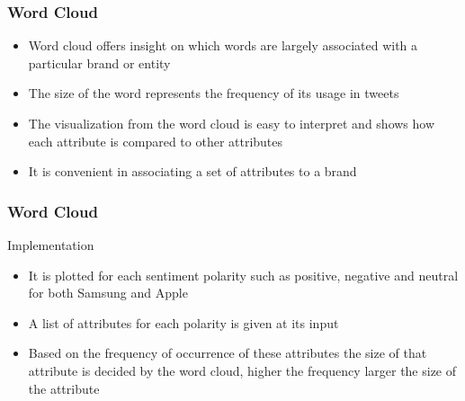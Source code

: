 \documentclass{beamer}
\begin{document}
\begin{frame}
\frametitle{Word Cloud}
\begin{itemize}
\item Word cloud offers insight on which words are largely associated with a particular brand or entity
\item  The size of the word represents the frequency of its usage in tweets
\item The visualization from the word cloud is easy to interpret and shows how each attribute is compared to other attributes
\item It is convenient in associating a set of attributes to a brand
\end{itemize}
\end{frame}

\begin{frame}
\frametitle{Word Cloud}
{\Large Implementation}
\begin{itemize}
\item It is plotted for each sentiment polarity such as positive, negative and neutral for both Samsung and Apple
\item  A list of attributes for each polarity is given at its input
\item Based on the frequency of occurrence of these attributes the size of that attribute is decided by the word cloud, higher the frequency larger the size of the attribute
\end{itemize}
\end{frame}
\end{document}
